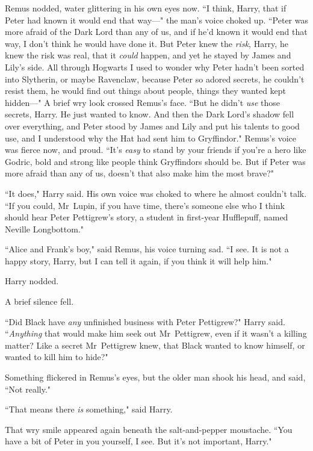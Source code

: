 Remus nodded, water glittering in his own eyes now. ``I think, Harry, that if Peter had known it would end that way—" the man's voice choked up. ``Peter was more afraid of the Dark Lord than any of us, and if he'd known it would end that way, I don't think he would have done it. But Peter knew the \emph{risk}, Harry, he knew the risk was real, that it \emph{could} happen, and yet he stayed by James and Lily's side. All through Hogwarts I used to wonder why Peter hadn't been sorted into Slytherin, or maybe Ravenclaw, because Peter so adored secrets, he couldn't resist them, he would find out things about people, things they wanted kept hidden—" A brief wry look crossed Remus's face. ``But he didn't \emph{use} those secrets, Harry. He just wanted to know. And then the Dark Lord's shadow fell over everything, and Peter stood by James and Lily and put his talents to good use, and I understood why the Hat had sent him to Gryffindor." Remus's voice was fierce now, and proud. ``It's \emph{easy} to stand by your friends if you're a hero like Godric, bold and strong like people think Gryffindors should be. But if Peter was more afraid than any of us, doesn't that also make him the most brave?"

``It does," Harry said. His own voice was choked to where he almost couldn't talk. ``If you could, Mr~Lupin, if you have time, there's someone else who I think should hear Peter Pettigrew's story, a student in first-year Hufflepuff, named Neville Longbottom."

``Alice and Frank's boy," said Remus, his voice turning sad. ``I see. It is not a happy story, Harry, but I can tell it again, if you think it will help him."

Harry nodded.

A brief silence fell.

``Did Black have \emph{any} unfinished business with Peter Pettigrew?" Harry said. ``\emph{Anything} that would make him seek out Mr~Pettigrew, even if it wasn't a killing matter? Like a secret Mr~Pettigrew knew, that Black wanted to know himself, or wanted to kill him to hide?"

Something flickered in Remus's eyes, but the older man shook his head, and said, ``Not really."

``That means there \emph{is} something," said Harry.

That wry smile appeared again beneath the salt-and-pepper moustache. ``You have a bit of Peter in you yourself, I see. But it's not important, Harry."

